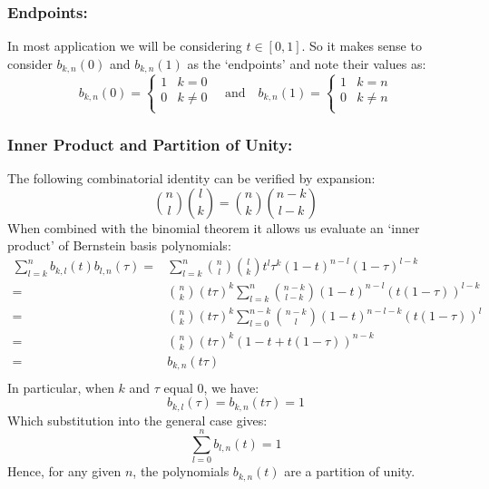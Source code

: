 \subsubsection{Endpoints:}
In most application we will be considering $t\in[0,1]$.
So it makes sense to consider $b_{k,n}(0)$ and $b_{k,n}(1)$ as the `endpoints' and note  their values as:
\[b_{k,n}(0) = \begin{cases}1& k=0\\0&k\neq0\\\end{cases}\quad\text{and}\quad b_{k,n}(1) = \begin{cases}1& k= n\\0&k\neq n\\\end{cases}\]

\subsubsection{Inner Product and Partition of Unity:}
The following combinatorial identity can be verified by expansion:
\[\binom{n}{l}\binom{l}{k} = \binom{n}{k}\binom{n-k}{l-k}\]
When combined with the binomial theorem it allows us evaluate an `inner product' of Bernstein basis polynomials:
\[\begin{aligned}
	\sum_{l=k}^nb_{k,l}(t)b_{l,n}(\tau) =& \sum_{l=k}^n\binom{n}{l}\binom{l}{k}t^l\tau^k(1-t)^{n-l}(1-\tau)^{l-k}\\
	=& \binom{n}{k}(t\tau)^k\sum_{l=k}^n\binom{n-k}{l-k}(1-t)^{n-l}(t(1-\tau))^{l-k}\\
	=& \binom{n}{k}(t\tau)^k\sum_{l=0}^{n-k}\binom{n-k}{l}(1-t)^{n-l-k}(t(1-\tau))^{l}\\
	=& \binom{n}{k}(t\tau)^k(1-t+t(1-\tau))^{n-k}\\
	=& b_{k,n}(t\tau)\\
\end{aligned}\]
In particular,
when $k$ and $\tau$ equal $0$, we have:
\[b_{k,l}(\tau) = b_{k,n}(t\tau) = 1\]
Which substitution into the general case gives:
\[\sum_{l=0}^nb_{l,n}(t) = 1\]
Hence,
for any given $n$,
the polynomials $b_{k,n}(t)$ are a partition of unity.

